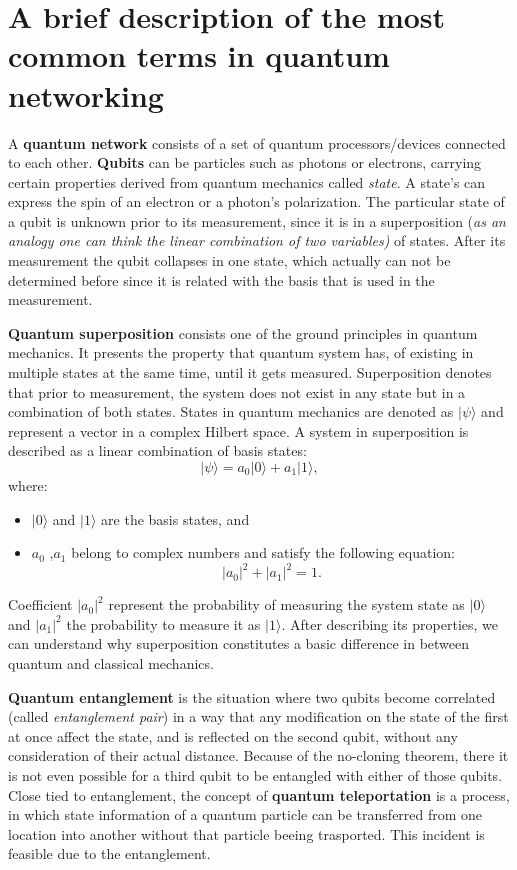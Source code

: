 		\section{A brief description of the most common terms in quantum networking}

		A \textbf{quantum network} consists of a set of quantum processors/devices connected to each other. \textbf{Qubits} can be particles such as photons
		or electrons, carrying certain properties derived from quantum mechanics called \textit{state}. A state's can express the spin of an electron or
		a photon's polarization. The particular state of a qubit is unknown prior to its measurement, since it is in a 
		superposition (\textit{as an analogy one can think the linear combination of two variables)} of states.
		After its measurement the qubit collapses in one state, which actually can not be determined
		before since it is related with the basis that is used in the measurement.
		
		\textbf{Quantum superposition} consists one of the ground principles in quantum mechanics. 
		It presents the property that quantum system has, of existing in multiple states at the same time, until it gets measured. 
		Superposition denotes that prior to measurement, the system does not exist in any state but in a combination of both states.
		States in quantum mechanics are denoted as $|\psi\rangle$ and represent a vector in a complex Hilbert space. 
		A system in superposition is described as a linear combination of basis states:
			\[
			|\psi\rangle = a_0 |0\rangle + a_1 |1\rangle,
			\]
		where:
		\begin{itemize}
			\item $|0\rangle$ and $|1\rangle$ are the basis states, and
			\item $a_0$ ,$a_1$ belong to complex numbers and satisfy the following equation:
			\[
			|a_0|^2 + |a_1|^2 = 1.
			\]
		\end{itemize}

		Coefficient $|a_0|^2$ represent the probability of measuring the system state as $|0\rangle$ and $|a_1|^2$ the probability to measure it
		as $|1\rangle$. After describing its properties, we can understand why superposition constitutes a 
		basic difference in between quantum and classical mechanics. 

		\textbf{Quantum entanglement} is the situation where two qubits become correlated
		(called \textit{entanglement pair}) in a way that
		any modification on the state of the first at once affect the state, and is reflected on the second qubit, 
		without any consideration of their actual distance. Because of the no-cloning theorem, there it is not even
		possible for a third qubit to be entangled with either of those qubits. Close tied to entanglement, the concept
		of \textbf{quantum teleportation} is a process, in which state information of a quantum particle can be transferred
		from one location into another without that particle beeing trasported.
		This incident is feasible due to the entanglement.
		

